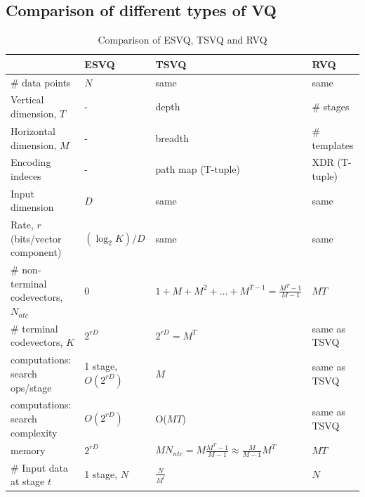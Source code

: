 \begin{Body}
\section{Comparison of different types of VQ}
\label{sec:comparison_VQ}
\begin{table}[htp]
\begin{longtable}{| p{2.2in} || p{1in} | p{1.5in} | p{1.5in}|}
\hline
											&ESVQ						&TSVQ																&RVQ								\\ 
\hline
\# data points								&$N$						&same																&same								\\ 
\hline
Vertical dimension, $T$					&-							&depth																&\# stages							\\
Horizontal dimension, $M$					&-							&breadth															&\# templates						\\
Encoding indeces							&-							&path map	(T-tuple)												&XDR (T-tuple)						\\ 
\hline
Input dimension							&$D$						&same																&same								\\
Rate, $r$ (bits/vector component)			&$(\log_2K)/D$			&same																&same								\\ 
\hline
\# non-terminal codevectors, $N_{ntc}$	&0							&$1+M+M^2+ \ldots + M^{T-1}=\frac{M^T-1}{M-1}$			&$MT$								\\
\# terminal codevectors, $K$				&$2^{rD}$					&$2^{rD}=M^T$													&same as TSVQ					\\
\hline
computations: search ops/stage			&1 stage, $O(2^{rD})$	&$M$																&same as TSVQ					\\
computations: search complexity 			&$O(2^{rD})$				&O($MT$)															&same  as TSVQ					\\ 
memory 									&$2^{rD}$					&$MN_{ntc} = M\frac{M^T-1}{M-1}\approx\frac{M}{M-1}M^T$ &$MT$								\\ 
\hline
\# Input data at stage $t$					&1 stage, $N$				&$\frac{N}{M^t}$													&$N$								\\
\hline
\end{longtable}
\caption{Comparison of ESVQ, TSVQ and RVQ}
\label{tab:comparison_ESVQ_TSVQ_RVQ}
\end{table}





\end{Body}
